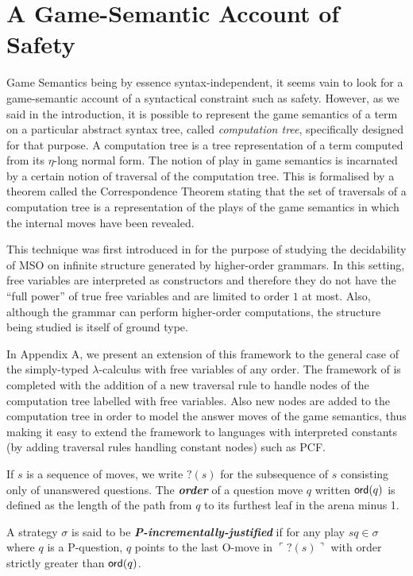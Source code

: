 \documentclass{llncs}
\newcommand\defname[1]{{\bf\em #1}\index{#1}}
\newcommand\ord[1]{{\sf ord}(#1)}
\newcommand\pcf{\textsf{PCF}}
\newcommand{\pview}[1]{\ulcorner #1 \urcorner}
\begin{document}
\section{A Game-Semantic Account of Safety}
\label{sec:gamesemaccount}
Game Semantics being by essence syntax-independent, it seems vain to look for a game-semantic account of a syntactical constraint such as safety. However, as we said in the introduction, it is possible to represent the game semantics of a term on a particular  abstract syntax tree, called \emph{computation tree}, specifically designed for that purpose. A computation tree is a tree representation of a term  computed from its $\eta$-long normal form. The notion of play in game semantics is incarnated by a certain notion of traversal of the computation tree. This is formalised by a theorem called the Correspondence Theorem stating that the set of traversals of a computation tree is a representation of the plays of the game semantics in which  the internal moves have been revealed.

This technique was first introduced in \cite{OngLics2006} for the purpose of studying the decidability of MSO on infinite structure generated by higher-order grammars. In this setting, free variables are interpreted as constructors and therefore they do not have the ``full power'' of true free variables and are limited to order $1$ at most. Also, although the grammar can perform higher-order computations, the structure being studied is itself of ground type.

In Appendix A, we present an extension of this framework to the general case of the simply-typed $\lambda$-calculus with free variables of any order. The framework of  \cite{OngLics2006} is completed with the addition of a new traversal rule to handle nodes of the computation tree labelled with free variables. Also new nodes are added to the computation tree in order to model the answer moves of the game semantics, thus making it easy to extend  the framework to languages with interpreted constants (by adding traversal rules handling constant nodes) such as \pcf.


If $s$ is a sequence of moves, we write $?(s)$ for the subsequence of $s$ consisting only of unanswered questions. The \defname{order} of
a question move $q$ written $\ord{q}$ is defined as the length of the path from $q$ to its furthest leaf in the arena minus 1.

\begin{definition}
A strategy $\sigma$ is said to be \defname{P-incrementally-justified}
if for any play $s q \in \sigma$ where $q$ is a P-question,
$q$ points to the last O-move in $\pview{?(s)}$ with order strictly greater than $\ord{q}$.
\end{definition}
\end{document}
